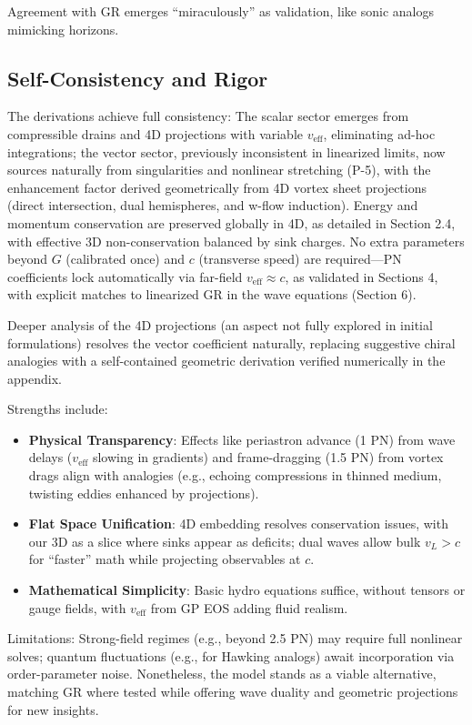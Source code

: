 \documentclass{article}
\begin{document}
Agreement with GR emerges ``miraculously'' as validation, like sonic analogs mimicking horizons.

\subsection{Self-Consistency and Rigor}

The derivations achieve full consistency: The scalar sector emerges from compressible drains and 4D projections with variable $v_{\text{eff}}$, eliminating ad-hoc integrations; the vector sector, previously inconsistent in linearized limits, now sources naturally from singularities and nonlinear stretching (P-5), with the enhancement factor derived geometrically from 4D vortex sheet projections (direct intersection, dual hemispheres, and w-flow induction). Energy and momentum conservation are preserved globally in 4D, as detailed in Section 2.4, with effective 3D non-conservation balanced by sink charges. No extra parameters beyond $G$ (calibrated once) and $c$ (transverse speed) are required---PN coefficients lock automatically via far-field $v_{\text{eff}} \approx c$, as validated in Sections 4, with explicit matches to linearized GR in the wave equations (Section 6).

Deeper analysis of the 4D projections (an aspect not fully explored in initial formulations) resolves the vector coefficient naturally, replacing suggestive chiral analogies with a self-contained geometric derivation verified numerically in the appendix.

Strengths include:
\begin{itemize}
\item \textbf{Physical Transparency}: Effects like periastron advance (1 PN) from wave delays ($v_{\text{eff}}$ slowing in gradients) and frame-dragging (1.5 PN) from vortex drags align with analogies (e.g., echoing compressions in thinned medium, twisting eddies enhanced by projections).
\item \textbf{Flat Space Unification}: 4D embedding resolves conservation issues, with our 3D as a slice where sinks appear as deficits; dual waves allow bulk $v_L > c$ for ``faster'' math while projecting observables at $c$.
\item \textbf{Mathematical Simplicity}: Basic hydro equations suffice, without tensors or gauge fields, with $v_{\text{eff}}$ from GP EOS adding fluid realism.
\end{itemize}

Limitations: Strong-field regimes (e.g., beyond 2.5 PN) may require full nonlinear solves; quantum fluctuations (e.g., for Hawking analogs) await incorporation via order-parameter noise. Nonetheless, the model stands as a viable alternative, matching GR where tested while offering wave duality and geometric projections for new insights.
\end{document}
